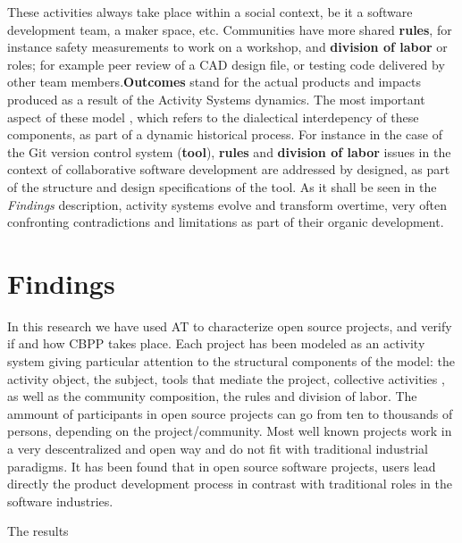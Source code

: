 \documentclass{ICED-Paper}%
\begin{document}
 These activities always take place within a social context, be it a software development team, a maker space, etc. Communities have more shared \textbf{rules}, for instance safety measurements to work on a workshop, and \textbf{division of labor} or roles; for example peer review of a CAD design file, or testing code delivered by other team members.\textbf{Outcomes} stand for the actual products and impacts produced as a result of the Activity Systems dynamics.
 The most important aspect of these model , which refers to the dialectical interdepency of these components, as part of a dynamic historical process. For instance in the case of the Git version control system (\textbf{tool}), \textbf{rules} and \textbf{division of labor} issues in the context of collaborative software development are addressed by designed, as part of the structure and design specifications of the tool. As it shall be seen in the \emph{Findings} description, activity systems evolve and transform overtime, very often confronting contradictions and limitations as part of their organic development.

\section{Findings}

In this research we have used AT to characterize open source projects, and verify if and how CBPP takes place. Each project has been modeled as an activity system giving particular attention to the structural components of the model: the activity object, the subject, tools that mediate the project, collective activities , as well as the community composition, the rules and division of labor. The ammount of participants in open source projects can go from ten to thousands of persons, depending on the project/community. Most well known projects work in a very descentralized and open way and do not fit with traditional industrial paradigms. It has been found that in open source software projects, users lead directly the product development process in contrast with traditional roles in the software industries\cite{HowItWorks}.

The results
\end{document}
